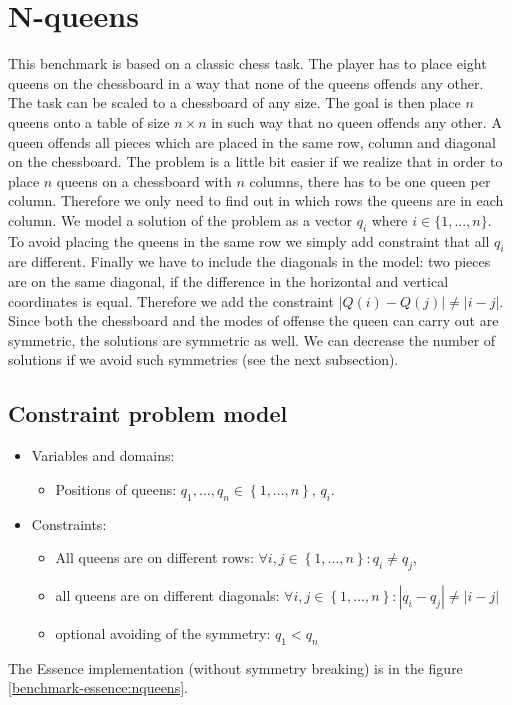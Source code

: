 \section{N-queens}
This benchmark is based on a classic chess task. The player has to place eight queens
on the chessboard in a way that none of the queens offends any other. The task
can be scaled to a chessboard of any size. The goal is then place $n$ queens 
onto a table of size $n \times n$ in such way that no queen offends any other. A queen
offends all pieces which are placed in the same row, column and diagonal on the chessboard.
The problem is a little bit easier if we realize that in order to place $n$ queens
on a chessboard with $n$ columns, there has to be one queen per column. Therefore 
we only need to find out in which rows the queens are in each column. We model a
solution of the problem as a vector $q_i$ where $i \in \{1,...,n\}$. To avoid
placing the queens in the same row we simply add constraint that all $q_i$ are 
different. Finally we have to include the diagonals in the model: two pieces are on the same diagonal, 
if the difference in the horizontal and vertical coordinates is equal. Therefore we 
add the constraint $\left|Q(i) - Q(j)\right| \neq \left|i - j\right|$.
Since both the chessboard and the modes of offense the queen can carry out are symmetric, the solutions are symmetric as well.
We can decrease the number of solutions if we avoid such symmetries (see the next subsection).

\subsection{Constraint problem model}
\begin{itemize}
	\item Variables and domains: 
    \begin{itemize}
      \item Positions of queens: $q_1, ..., q_n \in \left\{1, ..., n \right\}$, $q_i$.
    \end{itemize}
	\item Constraints:
    \begin{itemize}
     \item All queens are on different rows: $\forall i,j \in \left\{1, ..., n\right\}: q_i \neq q_j$,
	   \item all queens are on different diagonals: $\forall i,j \in \left\{1, ..., n\right\}: |q_i - q_j| \neq |i - j|$
	   \item optional avoiding of the symmetry: $q_1 < q_n$
	  \end{itemize}
\end{itemize}
The Essence implementation (without symmetry breaking) is in the figure \ref{benchmark-essence:nqueens}.

